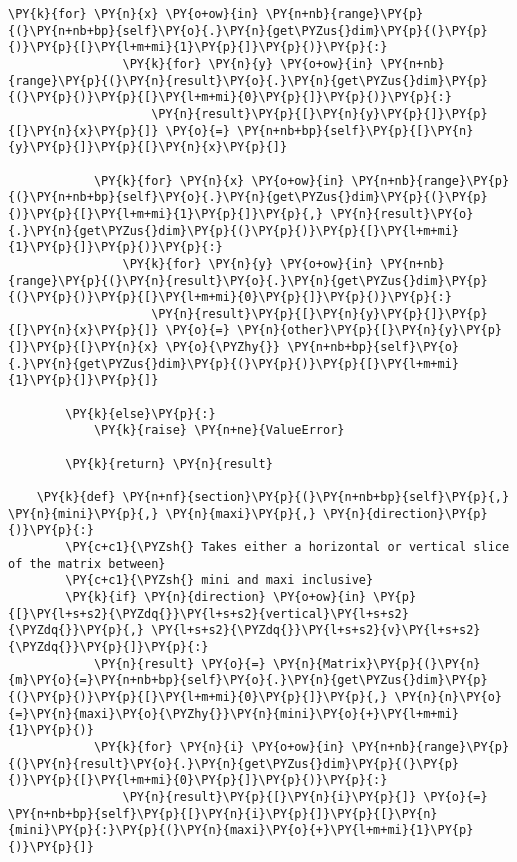 \begin{Verbatim}[commandchars=\\\{\}]
            \PY{k}{for} \PY{n}{x} \PY{o+ow}{in} \PY{n+nb}{range}\PY{p}{(}\PY{n+nb+bp}{self}\PY{o}{.}\PY{n}{get\PYZus{}dim}\PY{p}{(}\PY{p}{)}\PY{p}{[}\PY{l+m+mi}{1}\PY{p}{]}\PY{p}{)}\PY{p}{:}
                \PY{k}{for} \PY{n}{y} \PY{o+ow}{in} \PY{n+nb}{range}\PY{p}{(}\PY{n}{result}\PY{o}{.}\PY{n}{get\PYZus{}dim}\PY{p}{(}\PY{p}{)}\PY{p}{[}\PY{l+m+mi}{0}\PY{p}{]}\PY{p}{)}\PY{p}{:}
                    \PY{n}{result}\PY{p}{[}\PY{n}{y}\PY{p}{]}\PY{p}{[}\PY{n}{x}\PY{p}{]} \PY{o}{=} \PY{n+nb+bp}{self}\PY{p}{[}\PY{n}{y}\PY{p}{]}\PY{p}{[}\PY{n}{x}\PY{p}{]}

            \PY{k}{for} \PY{n}{x} \PY{o+ow}{in} \PY{n+nb}{range}\PY{p}{(}\PY{n+nb+bp}{self}\PY{o}{.}\PY{n}{get\PYZus{}dim}\PY{p}{(}\PY{p}{)}\PY{p}{[}\PY{l+m+mi}{1}\PY{p}{]}\PY{p}{,} \PY{n}{result}\PY{o}{.}\PY{n}{get\PYZus{}dim}\PY{p}{(}\PY{p}{)}\PY{p}{[}\PY{l+m+mi}{1}\PY{p}{]}\PY{p}{)}\PY{p}{:}
                \PY{k}{for} \PY{n}{y} \PY{o+ow}{in} \PY{n+nb}{range}\PY{p}{(}\PY{n}{result}\PY{o}{.}\PY{n}{get\PYZus{}dim}\PY{p}{(}\PY{p}{)}\PY{p}{[}\PY{l+m+mi}{0}\PY{p}{]}\PY{p}{)}\PY{p}{:}
                    \PY{n}{result}\PY{p}{[}\PY{n}{y}\PY{p}{]}\PY{p}{[}\PY{n}{x}\PY{p}{]} \PY{o}{=} \PY{n}{other}\PY{p}{[}\PY{n}{y}\PY{p}{]}\PY{p}{[}\PY{n}{x} \PY{o}{\PYZhy{}} \PY{n+nb+bp}{self}\PY{o}{.}\PY{n}{get\PYZus{}dim}\PY{p}{(}\PY{p}{)}\PY{p}{[}\PY{l+m+mi}{1}\PY{p}{]}\PY{p}{]}

        \PY{k}{else}\PY{p}{:}
            \PY{k}{raise} \PY{n+ne}{ValueError}

        \PY{k}{return} \PY{n}{result}
        
    \PY{k}{def} \PY{n+nf}{section}\PY{p}{(}\PY{n+nb+bp}{self}\PY{p}{,} \PY{n}{mini}\PY{p}{,} \PY{n}{maxi}\PY{p}{,} \PY{n}{direction}\PY{p}{)}\PY{p}{:}
        \PY{c+c1}{\PYZsh{} Takes either a horizontal or vertical slice of the matrix between}
        \PY{c+c1}{\PYZsh{} mini and maxi inclusive}
        \PY{k}{if} \PY{n}{direction} \PY{o+ow}{in} \PY{p}{[}\PY{l+s+s2}{\PYZdq{}}\PY{l+s+s2}{vertical}\PY{l+s+s2}{\PYZdq{}}\PY{p}{,} \PY{l+s+s2}{\PYZdq{}}\PY{l+s+s2}{v}\PY{l+s+s2}{\PYZdq{}}\PY{p}{]}\PY{p}{:}
            \PY{n}{result} \PY{o}{=} \PY{n}{Matrix}\PY{p}{(}\PY{n}{m}\PY{o}{=}\PY{n+nb+bp}{self}\PY{o}{.}\PY{n}{get\PYZus{}dim}\PY{p}{(}\PY{p}{)}\PY{p}{[}\PY{l+m+mi}{0}\PY{p}{]}\PY{p}{,} \PY{n}{n}\PY{o}{=}\PY{n}{maxi}\PY{o}{\PYZhy{}}\PY{n}{mini}\PY{o}{+}\PY{l+m+mi}{1}\PY{p}{)}
            \PY{k}{for} \PY{n}{i} \PY{o+ow}{in} \PY{n+nb}{range}\PY{p}{(}\PY{n}{result}\PY{o}{.}\PY{n}{get\PYZus{}dim}\PY{p}{(}\PY{p}{)}\PY{p}{[}\PY{l+m+mi}{0}\PY{p}{]}\PY{p}{)}\PY{p}{:}
                \PY{n}{result}\PY{p}{[}\PY{n}{i}\PY{p}{]} \PY{o}{=} \PY{n+nb+bp}{self}\PY{p}{[}\PY{n}{i}\PY{p}{]}\PY{p}{[}\PY{n}{mini}\PY{p}{:}\PY{p}{(}\PY{n}{maxi}\PY{o}{+}\PY{l+m+mi}{1}\PY{p}{)}\PY{p}{]}
        

\end{Verbatim}
